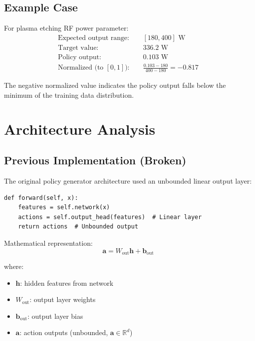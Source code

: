 \documentclass[11pt,a4paper]{article}
\begin{document}
\subsection{Example Case}

For plasma etching RF power parameter:
\begin{align*}
\text{Expected output range:} \quad &[180, 400] \text{ W} \\
\text{Target value:} \quad &336.2 \text{ W} \\
\text{Policy output:} \quad &0.103 \text{ W} \\
\text{Normalized (to } [0,1]): \quad &\frac{0.103 - 180}{400 - 180} = -0.817
\end{align*}

The negative normalized value indicates the policy output falls below the minimum of the training data distribution.

\section{Architecture Analysis}

\subsection{Previous Implementation (Broken)}

The original policy generator architecture used an unbounded linear output layer:

\begin{lstlisting}[caption={Original PolicyGenerator forward pass}]
def forward(self, x):
    features = self.network(x)
    actions = self.output_head(features)  # Linear layer
    return actions  # Unbounded output
\end{lstlisting}

Mathematical representation:
\begin{equation}
\mathbf{a} = W_{\text{out}} \mathbf{h} + \mathbf{b}_{\text{out}}
\end{equation}

where:
\begin{itemize}
    \item $\mathbf{h}$: hidden features from network
    \item $W_{\text{out}}$: output layer weights
    \item $\mathbf{b}_{\text{out}}$: output layer bias
    \item $\mathbf{a}$: action outputs (unbounded, $\mathbf{a} \in \mathbb{R}^d$)
\end{itemize}
\end{document}
